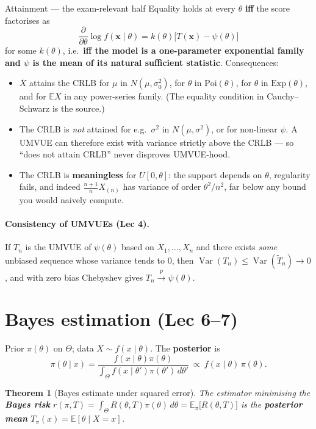 \documentclass[11pt]{article}
\newtheorem{theorem}{Theorem}[section]
\theoremstyle{remark}
\newcommand{\E}{\mathbb{E}}
\newcommand{\Var}{\operatorname{Var}}
\newcommand{\Xbar}{\overline{X}}
\newcommand{\pto}{\overset{p}{\longrightarrow}}
\begin{document}
\begin{keybox}{Attainment --- the exam-relevant half}
Equality holds at every $\theta$ \textbf{iff} the score factorises as
\[
\frac{\partial}{\partial\theta}\log f(\mathbf{x}\mid\theta)=k(\theta)\big[T(\mathbf{x})-\psi(\theta)\big]
\]
for some $k(\theta)$, i.e.\ \textbf{iff the model is a one-parameter exponential family and
$\psi$ is the mean of its natural sufficient statistic}. Consequences:
\begin{itemize}
\item $\Xbar$ attains the CRLB for $\mu$ in $N(\mu,\sigma_0^2)$, for $\theta$ in
$\mathrm{Poi}(\theta)$, for $\theta$ in $\mathrm{Exp}(\theta)$, and for $\E X$ in any
power-series family. (The equality condition in Cauchy--Schwarz is the source.)
\item The CRLB is \emph{not} attained for e.g.\ $\sigma^2$ in $N(\mu,\sigma^2)$, or for
non-linear $\psi$. A UMVUE can therefore exist with variance strictly above the CRLB --- so
``does not attain CRLB'' never disproves UMVUE-hood.
\item The CRLB is \textbf{meaningless} for $U[0,\theta]$: the support depends on $\theta$,
regularity fails, and indeed $\frac{n+1}{n}X_{(n)}$ has variance of order $\theta^2/n^2$,
far below any bound you would naively compute.
\end{itemize}
\end{keybox}

\paragraph{Consistency of UMVUEs (Lec 4).}
If $T_n$ is the UMVUE of $\psi(\theta)$ based on $X_1,\dots,X_n$ and there exists \emph{some}
unbiased sequence whose variance tends to $0$, then $\Var(T_n)\le\Var(\tilde T_n)\to0$, and
with zero bias Chebyshev gives $T_n\pto\psi(\theta)$.

\section{Bayes estimation (Lec 6--7)}

Prior $\pi(\theta)$ on $\Theta$; data $X\sim f(x\mid\theta)$. The \textbf{posterior} is
\[
\pi(\theta\mid x)=\frac{f(x\mid\theta)\pi(\theta)}{\int_\Theta f(x\mid\theta')\pi(\theta')\,d\theta'}
\ \propto\ f(x\mid\theta)\,\pi(\theta).
\]

\begin{theorem}[Bayes estimate under squared error]
The estimator minimising the \textbf{Bayes risk}
$r(\pi,T)=\int_\Theta R(\theta,T)\pi(\theta)\,d\theta=\E_\pi\big[R(\theta,T)\big]$
is the \textbf{posterior mean} $T_\pi(x)=\E[\theta\mid X=x]$.
\end{theorem}
\end{document}

